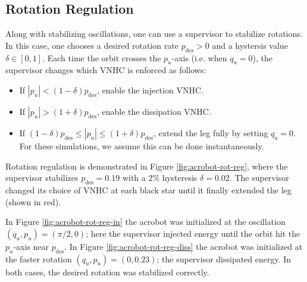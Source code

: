 \documentclass[journal,twoside,web]{ieeecolor}
\begin{document}
\subsection{Rotation Regulation}
Along with stabilizing oscillations, one can use a supervisor to stabilize
rotations.
In this case, one chooses a desired rotation rate \(p_\text{des} > 0\) and a
hystersis value \(\delta \in [0,1]\).
Each time the orbit crosses the \(p_u\)-axis (i.e. when \(q_u = 0\)), the
supervisor changes which VNHC is enforced as follows:
\begin{itemize}
    \item If \(|p_u| < (1-\delta)p_\text{des}\), enable the injection VNHC.
    \item If \(|p_u| > (1+\delta)p_\text{des}\), enable the dissipation VNHC.
    \item If \((1-\delta)p_\text{des} \leq |p_u| \leq (1+\delta)p_\text{des}\),
        extend the leg fully by setting \(q_a = 0\).
        For these simulations, we assume this can be done instantaneously.
\end{itemize}

Rotation regulation is demonstrated in Figure \ref{fig:acrobot-rot-reg}, where
the supervisor stabilizes \(p_\text{des} = 0.19\) with a \(2\%\) hysteresis 
\(\delta = 0.02\).
The supervisor changed its choice of VNHC at each black star until it finally extended
the leg (shown in red).

In Figure \ref{fig:acrobot-rot-reg-in} the acrobot was initialized at the
oscillation \((q_u,p_u) = (\pi/2,0)\); here the supervisor injected energy until
the orbit hit the \(p_u\)-axis near \(p_\text{des}\).
In Figure \ref{fig:acrobot-rot-reg-diss} the acrobot was initialized at the
faster rotation \((q_u,p_u) = (0, 0.23)\); the supervisor dissipated energy.
In both cases, the desired rotation was stabilized correctly.
\end{document}
